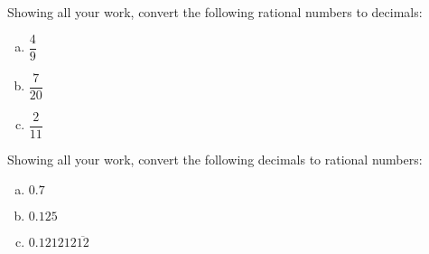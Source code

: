 \documentclass[11pt,letterpaper]{article}
\begin{document}
\newpage



 Showing all your work, convert the following rational numbers to decimals:
	\begin{enumerate}[(a)]
	\item $\dfrac{4}{9}$
	\item $\dfrac{7}{20}$
	\item $\dfrac{2}{11}$
	\end{enumerate}



\newpage



 Showing all your work, convert the following decimals to rational numbers:
	\begin{enumerate}[(a)]
	\item $0.7$
	\item $0.125$
	\item $0.121212\overline{12}$
	\end{enumerate}
\end{document}
